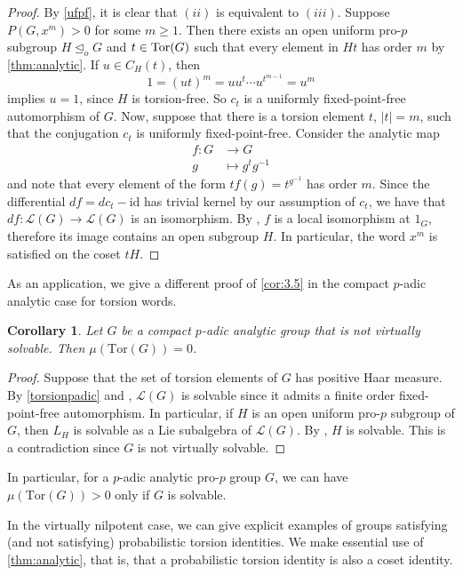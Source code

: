 \documentclass[a4paper,10pt]{amsart}
\theoremstyle{plain}
\newtheorem{corollary}[thm]{Corollary}
\theoremstyle{definition}
\numberwithin{equation}{section}
\begin{document}
\begin{proof}
By \cref{ufpf}, it is clear that $(ii)$ is equivalent to $(iii)$. Suppose $P(G,x^{m}) > 0$ for some $m\geq 1$. Then there exists an open uniform pro-$p$ subgroup $H\unlhd_o G$ and $t \in {\rm{Tor}}(G)$ such that every element in $Ht$ has order $m$ by \cref{thm:analytic}. If $u \in C_H(t)$, then
\[1=(ut)^{m} = uu^t\cdots u^{t^{m-1}} = u^{m}\]
implies $u=1$, since $H$ is torsion-free. So $c_t$ is a uniformly fixed-point-free automorphism of $G$.
Now, suppose that there is a torsion element $t$, $|t|=m$, such that the conjugation $c_t$ is uniformly fixed-point-free. Consider the analytic map 
	\begin{align*}
		f\colon G &\to G\\
		g &\mapsto g^tg^{-1}
	\end{align*} and note that every element of the form $tf(g)=t^{g^{-1}}$ has order $m$. Since the differential $df=dc_t-\mathrm{id}$ has trivial kernel by our assumption of $c_t$, we have that $df\colon\mathcal{L}(G)\to\mathcal{L}(G)$ is an isomorphism. By \cite[Pt.~2, Ch.~III.9, Theorem~2]{Ser65}, $f$ is a local isomorphism at $1_G$, therefore its image contains an open subgroup $H$. In particular, the word $x^m$ is satisfied on the coset $tH$.
\end{proof}

As an application, we give a different proof of \cref{cor:3.5} in the compact $p$-adic analytic case for torsion words. 
\begin{corollary}\label{cor:krekninpadic}
Let $G$ be a compact $p$-adic analytic group that is not virtually solvable. Then $\mu(\mathrm{Tor}(G))=0$.
\end{corollary}
\begin{proof}
Suppose that the set of torsion elements of $G$ has positive Haar measure. By \cref{torsionpadic} and \cite[Theorem 4.3.1]{Khu93}, $\mathcal{L}(G)$ is solvable since it admits a finite order fixed-point-free automorphism. In particular, if $H$ is an open uniform pro-$p$ subgroup of $G$, then $L_H$ is solvable as a Lie subalgebra of $\mathcal{L}(G)$. By \cite[Corollary 7.16]{DDMS}, $H$ is solvable. This is a contradiction since $G$ is not virtually solvable.
\end{proof}
In particular, for a $p$-adic analytic pro-$p$ group $G$, we can have $\mu(\mathrm{Tor}(G))>0$ only if $G$ is solvable.

In the virtually nilpotent case, we can give explicit examples of groups satisfying (and not satisfying) probabilistic torsion identities. We make essential use of \cref{thm:analytic}, that is, that a probabilistic torsion identity is also a coset identity.
\end{document}
